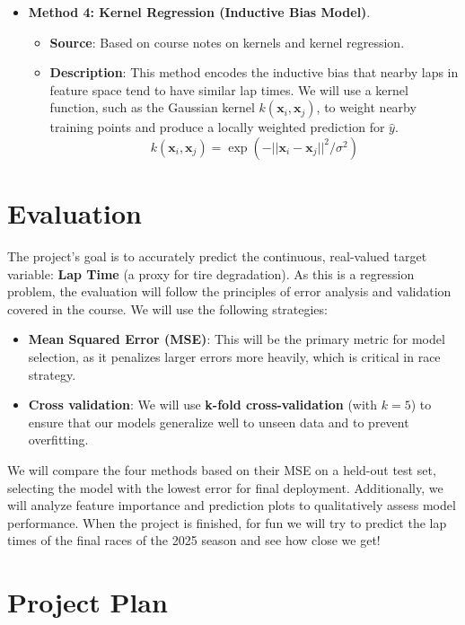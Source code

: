 \documentclass[english]{article}
\begin{document}
\begin{itemize}
    \item \textbf{Method 4: Kernel Regression (Inductive Bias Model)}.
    \begin{itemize}
        \item \textbf{Source}: Based on course notes on kernels and kernel regression.
        \item \textbf{Description}: This method encodes the inductive bias that nearby laps in feature space tend to have similar lap times. We will use a kernel function, such as the Gaussian kernel $k(\mathbf{x}_i, \mathbf{x}_j)$, to weight nearby training points and produce a locally weighted prediction for $\hat{y}$.
        $$ k(\mathbf{x}_i, \mathbf{x}_j) = \exp \left( -||\mathbf{x}_i - \mathbf{x}_j||^2 / \sigma^2 \right) $$
    \end{itemize}
\end{itemize}

\section{Evaluation}
The project's goal is to accurately predict the continuous, real-valued target variable: \textbf{Lap Time} (a proxy for tire degradation). As this is a regression problem, the evaluation will follow the principles of error analysis and validation covered in the course. We will use the following strategies:
\begin{itemize}
    \item \textbf{Mean Squared Error (MSE)}: This will be the primary metric for model selection, as it penalizes larger errors more heavily, which is critical in race strategy.
    \item \textbf{Cross validation}: We will use \textbf{k-fold cross-validation} (with $k=5$) to ensure that our models generalize well to unseen data and to prevent overfitting.
\end{itemize}
We will compare the four methods based on their MSE on a held-out test set, selecting the model with the lowest error for final deployment. Additionally, we will analyze feature importance and prediction plots to qualitatively assess model performance. When the project is finished, for fun we will try to predict the lap times of the final races of the 2025 season and see how close we get!

\newpage
\section{Project Plan}
\end{document}
